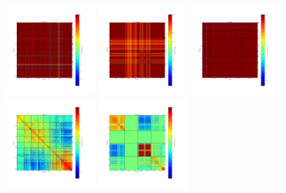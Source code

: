 \begin{figure}[ht] %
\begin{center}
\includegraphics[width=0.3\textwidth]{Figures/DarkTests/corrmat_TOI_array_1_20160313s87.pdf}
\includegraphics[width=0.3\textwidth]{Figures/DarkTests/corrmat_TOI_array_2_20160313s87.pdf}
\includegraphics[width=0.3\textwidth]{Figures/DarkTests/corrmat_TOI_array_3_20160313s87.pdf}
\includegraphics[width=0.3\textwidth]{Figures/DarkTests/corrmat_TOI_CM_array_1_20160313s87.pdf}
\includegraphics[width=0.3\textwidth]{Figures/DarkTests/corrmat_TOI_CM_array_2_20160313s87.pdf}

\end{center}
\end{figure}
